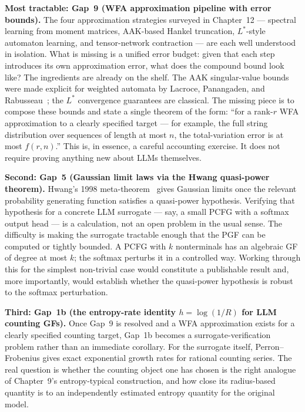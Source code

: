 \textbf{Most tractable: Gap~9 (WFA approximation pipeline with
error bounds).}  The four approximation strategies surveyed in
Chapter~12 --- spectral learning from moment matrices, AAK-based
Hankel truncation, $L^*$-style automaton learning, and tensor-network
contraction --- are each well understood in isolation.  What is missing
is a unified error budget: given that each step introduces its own
approximation error, what does the compound bound look like?  The
ingredients are already on the shelf.  The AAK singular-value bounds
were made explicit for weighted automata by Lacroce, Panangaden, and
Rabusseau~\cite{LacrocePanangadenRabusseau2021}; the $L^*$ convergence
guarantees are classical.  The missing piece is to compose these bounds
and state a single theorem of the form: ``for a rank-$r$ WFA
approximation to a clearly specified target --- for example, the full
string distribution over sequences of length at most
$n$, the total-variation error is at most $f(r,n)$.''  This is, in
essence, a careful accounting exercise.  It does not require proving
anything new about LLMs themselves.

\textbf{Second: Gap~5 (Gaussian limit laws via the Hwang quasi-power
theorem).}  Hwang's 1998 meta-theorem~\cite{Hwang1998} gives Gaussian
limits once the relevant probability generating function satisfies a
quasi-power hypothesis.  Verifying that hypothesis for a
concrete LLM surrogate --- say, a small PCFG with a softmax output head
--- is a calculation, not an open problem in the usual sense.  The
difficulty is making the surrogate tractable enough that the PGF can be
computed or tightly bounded.  A PCFG with $k$ nonterminals has an
algebraic GF of degree at most $k$; the softmax perturbs it in a
controlled way.  Working through this for the simplest non-trivial case
would constitute a publishable result and, more importantly, would
establish whether the quasi-power hypothesis is robust to the softmax
perturbation.

\textbf{Third: Gap~1b (the entropy-rate identity $h = \log(1/R)$ for
LLM counting GFs).}  Once Gap~9 is resolved and a WFA approximation
exists for a clearly specified counting target, Gap~1b becomes a
surrogate-verification problem rather than an immediate corollary.  For
the surrogate itself, Perron--Frobenius gives exact exponential growth
rates for rational counting series.  The real question is whether the
counting object one has chosen is the right analogue of Chapter~9's
entropy-typical construction, and how close its radius-based quantity is
to an independently estimated entropy quantity for the original model.

